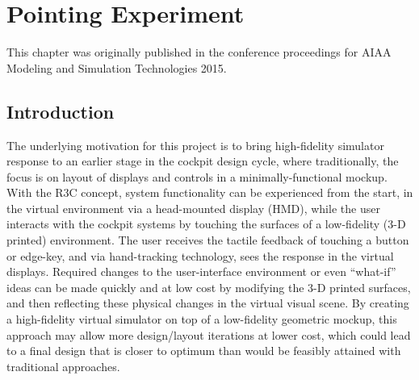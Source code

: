 \chapter{Pointing Experiment}
\label{chap:pointing}

This chapter was originally published in the conference proceedings for AIAA Modeling and Simulation Technologies 2015.

\section{Introduction}

The underlying motivation for this project is to bring high-fidelity simulator response to an earlier stage in the cockpit design cycle, where traditionally, the focus is on layout of displays and controls in a minimally-functional mockup.
With the R3C concept, system functionality can be experienced from the start, in the virtual environment via a head-mounted display (HMD), while the user interacts with the cockpit systems by touching the surfaces of a low-fidelity (3-D printed) environment.
The user receives the tactile feedback of touching a button or edge-key, and via hand-tracking technology, sees the response in the virtual displays.
Required changes to the user-interface environment or even ``what-if'' ideas can be made quickly and at low cost by modifying the 3-D printed surfaces, and then reflecting these physical changes in the virtual visual scene.
By creating a high-fidelity virtual simulator on top of a low-fidelity geometric mockup, this approach may allow more design/layout iterations at lower cost, which could lead to a final design that is closer to optimum than would be feasibly attained with traditional approaches.

